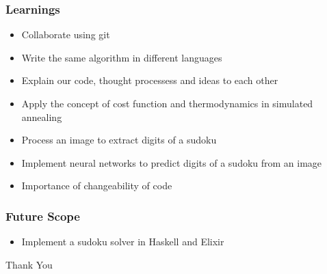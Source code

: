 \documentclass{beamer}
\begin{document}
\begin{frame}
     \frametitle{Learnings}
     \begin{itemize}
		 \item Collaborate using git
		 \item Write the same algorithm in different languages
		 \item Explain our code, thought processess and ideas to each other
		 \item Apply the concept of cost function and thermodynamics in simulated annealing
		 \item Process an image to extract digits of a sudoku
		 \item Implement neural networks to predict digits of a sudoku from an image
		 \item Importance of changeability of code
	 \end{itemize}
\end{frame}

\begin{frame}
    \frametitle{Future Scope}   
    \begin{itemize}
         \item Implement a sudoku solver in Haskell and Elixir
    \end{itemize}
\end{frame}

\begin{frame}
    \centering \huge {Thank You}
\end{frame}
\end{document}
